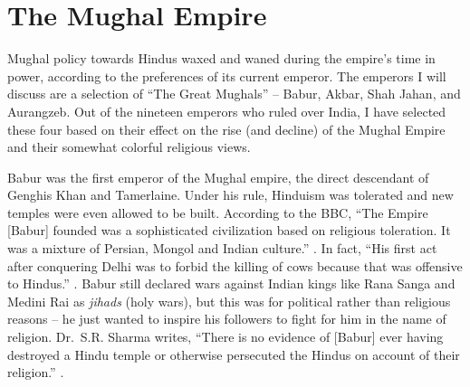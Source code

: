 \documentclass[11pt, letterpaper]{article}
\begin{document}
\section{The Mughal Empire}\label{the-mughal-empire}

Mughal policy towards Hindus waxed and waned during the empire's time in
power, according to the preferences of its current emperor. The emperors
I will discuss are a selection of ``The Great Mughals'' -- Babur, Akbar,
Shah Jahan, and Aurangzeb. Out of the nineteen emperors who ruled over
India, I have selected these four based on their effect on the rise (and
decline) of the Mughal Empire and their somewhat colorful religious
views.

Babur was the first emperor of the Mughal empire, the direct descendant
of Genghis Khan and Tamerlaine. Under his rule, Hinduism was tolerated
and new temples were even allowed to be built. According to the BBC,
``The Empire {[}Babur{]} founded was a sophisticated civilization based
on religious toleration. It was a mixture of Persian, Mongol and Indian
culture.'' \cite{babur}. In fact, ``His first act after conquering Delhi was to
forbid the killing of cows because that was offensive to Hindus.''
\cite{babur}. Babur still declared wars against Indian kings like Rana Sanga
and Medini Rai as \emph{jihads} (holy wars), but this was for political
rather than religious reasons -- he just wanted to inspire his followers
to fight for him in the name of religion. Dr.~S.R. Sharma writes,
``There is no evidence of {[}Babur{]} ever having destroyed a Hindu
temple or otherwise persecuted the Hindus on account of their
religion.'' \cite{sharma}.
\end{document}
